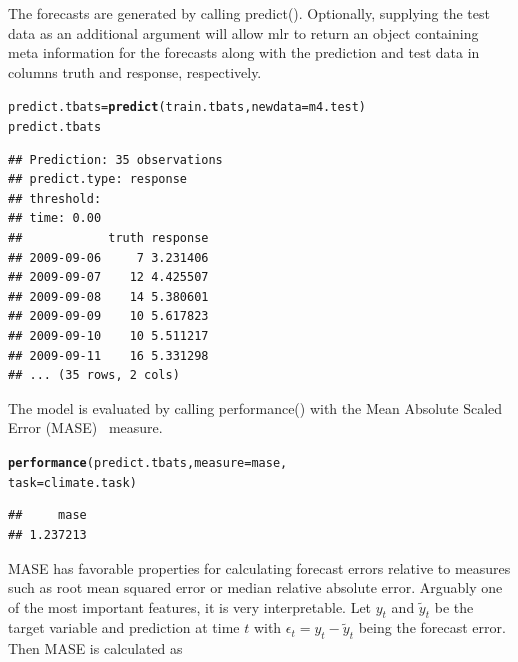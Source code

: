 \documentclass[12pt]{article}\usepackage[]{graphicx}\usepackage[]{color}
\makeatletter
\newcommand{\hlstd}[1]{\textcolor[rgb]{0.345,0.345,0.345}{#1}}%
\newcommand{\hlkwb}[1]{\textcolor[rgb]{0.69,0.353,0.396}{#1}}%
\newcommand{\hlkwc}[1]{\textcolor[rgb]{0.333,0.667,0.333}{#1}}%
\newcommand{\hlkwd}[1]{\textcolor[rgb]{0.737,0.353,0.396}{\textbf{#1}}}%
\newenvironment{kframe}{%
 \def\at@end@of@kframe{}%
 \ifinner\ifhmode%
  \def\at@end@of@kframe{\end{minipage}}%
  \begin{minipage}{\columnwidth}%
 \fi\fi%
 \def\FrameCommand##1{\hskip\@totalleftmargin \hskip-\fboxsep
 \colorbox{shadecolor}{##1}\hskip-\fboxsep
     \hskip-\linewidth \hskip-\@totalleftmargin \hskip\columnwidth}%
 \MakeFramed {\advance\hsize-\width
   \@totalleftmargin\z@ \linewidth\hsize
   \@setminipage}}%
 {\par\unskip\endMakeFramed%
 \at@end@of@kframe}
\newenvironment{knitrout}{}{} %
\theoremstyle{definition}
\newcommand\code{\@codex}
\def\@codex#1{{\normalfont\ttfamily\hyphenchar\font=-1 #1}}
\newcommand{\pkg}[1]{{\fontseries{b}\selectfont #1}}
\makeatother
\begin{document}
The forecasts are generated by calling \code{predict()}. Optionally, supplying the test data as an additional argument will allow \pkg{mlr} to return an object containing meta information for the forecasts along with the prediction and test data in columns \code{truth} and \code{response}, respectively.

\singlespacing
\begin{knitrout}
\color{fgcolor}\begin{kframe}
\begin{alltt}
\hlstd{predict.tbats} \hlkwb{=} \hlkwd{predict}\hlstd{(train.tbats,} \hlkwc{newdata} \hlstd{= m4.test)}
\hlstd{predict.tbats}
\end{alltt}
\begin{verbatim}
## Prediction: 35 observations
## predict.type: response
## threshold: 
## time: 0.00
##            truth response
## 2009-09-06     7 3.231406
## 2009-09-07    12 4.425507
## 2009-09-08    14 5.380601
## 2009-09-09    10 5.617823
## 2009-09-10    10 5.511217
## 2009-09-11    16 5.331298
## ... (35 rows, 2 cols)
\end{verbatim}
\end{kframe}
\end{knitrout}
\doublespacing

The model is evaluated by calling \code{performance()} with the Mean Absolute Scaled Error (MASE)~\cite{Hyndman2006} measure.

\singlespacing
\begin{knitrout}
\color{fgcolor}\begin{kframe}
\begin{alltt}
\hlkwd{performance}\hlstd{(predict.tbats,} \hlkwc{measure} \hlstd{= mase,}
            \hlkwc{task} \hlstd{= climate.task)}
\end{alltt}
\begin{verbatim}
##     mase 
## 1.237213
\end{verbatim}
\end{kframe}
\end{knitrout}
\doublespacing
MASE has favorable properties for calculating forecast errors relative to measures such as root mean squared error or median relative absolute error. Arguably one of the most important features, it is very interpretable. Let $y_t$ and $\tilde{y}_t$ be the target variable and prediction at time $t$ with $\epsilon_t = y_t - \tilde{y}_t$ being the forecast error. Then MASE is calculated as
\end{document}
